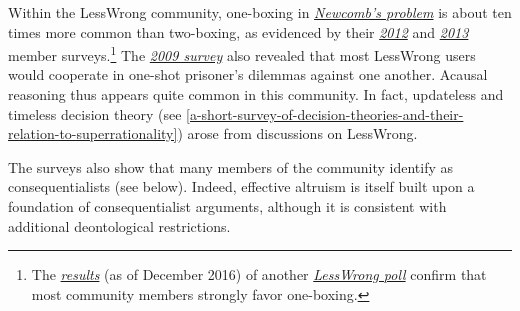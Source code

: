 Within the LessWrong community, one-boxing in
\href{https://en.wikipedia.org/wiki/Newcomb\%27s_paradox}{\emph{Newcomb's
problem}} is about ten times more common than two-boxing, as evidenced
by their
\href{http://lesswrong.com/lw/fp5/2012_survey_results/}{\emph{2012}} and
\href{http://lesswrong.com/lw/jj0/2013_survey_results/}{\emph{2013}}
member surveys.\footnote{The
  \href{https://casparoesterheld.files.wordpress.com/2016/12/newcombpayoffratiosurveydec2016.jpeg}{\emph{results}}
  (as of December 2016) of another
  \href{http://lesswrong.com/r/discussion/lw/hpy/normative_uncertainty_in_newcombs_problem/969i}{\emph{LessWrong
  poll}} confirm that most community members strongly favor one-boxing.}
The \href{http://lesswrong.com/lw/fk/survey_results/}{\emph{2009
survey}} also revealed that most LessWrong users would cooperate in
one-shot prisoner's dilemmas against one another. Acausal reasoning thus
appears quite common in this community. In fact, updateless and timeless
decision theory (see
\ref{a-short-survey-of-decision-theories-and-their-relation-to-superrationality}) arose from discussions on LessWrong.

The surveys also show that many members of the community identify as
consequentialists (see below). Indeed, effective altruism is itself
built upon a foundation of consequentialist arguments, although it is
consistent with additional deontological restrictions.

